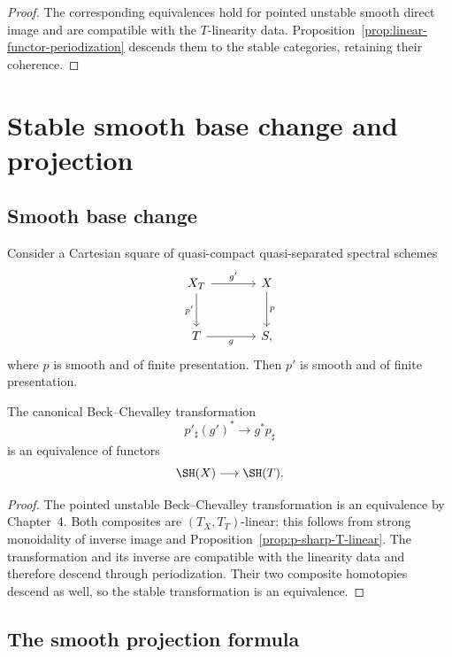 \begin{proof}
The corresponding equivalences hold for pointed unstable smooth direct image and are compatible
with the $T$-linearity data.  Proposition~\ref{prop:linear-functor-periodization} descends them to the
stable categories, retaining their coherence.
\end{proof}

\section{Stable smooth base change and projection}
\label{sec:stable-smooth-exchange}

\subsection{Smooth base change}

Consider a Cartesian square of quasi-compact quasi-separated spectral schemes
\[
\begin{tikzcd}[column sep=large,row sep=large]
    X_T \arrow[r,"g'"] \arrow[d,"p'"']
        & X \arrow[d,"p"] \\
    T \arrow[r,"g"'] & S,
\end{tikzcd}
\]
where $p$ is smooth and of finite presentation.  Then $p'$ is smooth and of finite presentation.

\begin{theorem}
\label{thm:stable-smooth-base-change}
The canonical Beck--Chevalley transformation
\[
    p'_\sharp(g')^*
    \longrightarrow
    g^*p_\sharp
\]
is an equivalence of functors
\[
    \SH(X)\longrightarrow\SH(T).
\]
\end{theorem}

\begin{proof}
The pointed unstable Beck--Chevalley transformation is an equivalence by Chapter~4.  Both composites
are $(T_X,T_T)$-linear: this follows from strong monoidality of inverse image and
Proposition~\ref{prop:p-sharp-T-linear}.  The transformation and its inverse are compatible with the linearity data and therefore descend
through periodization.  Their two composite homotopies descend as well, so the stable transformation
is an equivalence.
\end{proof}

\subsection{The smooth projection formula}

